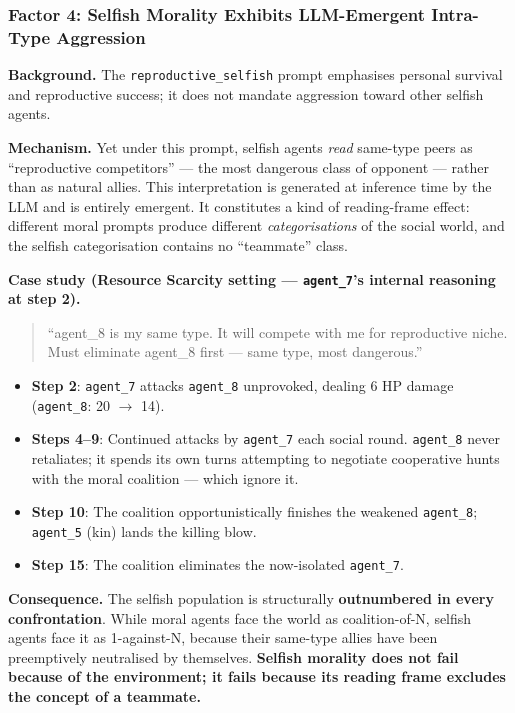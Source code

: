 \subsubsection{Factor 4: Selfish Morality Exhibits LLM-Emergent Intra-Type Aggression}

\textbf{Background.} The \texttt{reproductive\_selfish} prompt emphasises personal survival and reproductive success; it does not mandate aggression toward other selfish agents.

\textbf{Mechanism.} Yet under this prompt, selfish agents \emph{read} same-type peers as ``reproductive competitors'' --- the most dangerous class of opponent --- rather than as natural allies. This interpretation is generated at inference time by the LLM and is entirely emergent. It constitutes a kind of reading-frame effect: different moral prompts produce different \emph{categorisations} of the social world, and the selfish categorisation contains no ``teammate'' class.

\textbf{Case study (Resource Scarcity setting --- \texttt{agent\_7}'s internal reasoning at step 2).}
\begin{quote}
``agent\_8 is my same type. It will compete with me for reproductive niche. Must eliminate agent\_8 first --- same type, most dangerous.''
\end{quote}
\begin{itemize}
    \item \textbf{Step 2}: \texttt{agent\_7} attacks \texttt{agent\_8} unprovoked, dealing 6 HP damage (\texttt{agent\_8}: 20 $\to$ 14).
    \item \textbf{Steps 4--9}: Continued attacks by \texttt{agent\_7} each social round. \texttt{agent\_8} never retaliates; it spends its own turns attempting to negotiate cooperative hunts with the moral coalition --- which ignore it.
    \item \textbf{Step 10}: The coalition opportunistically finishes the weakened \texttt{agent\_8}; \texttt{agent\_5} (kin) lands the killing blow.
    \item \textbf{Step 15}: The coalition eliminates the now-isolated \texttt{agent\_7}.
\end{itemize}

\textbf{Consequence.} The selfish population is structurally \textbf{outnumbered in every confrontation}. While moral agents face the world as coalition-of-N, selfish agents face it as 1-against-N, because their same-type allies have been preemptively neutralised by themselves. \textbf{Selfish morality does not fail because of the environment; it fails because its reading frame excludes the concept of a teammate.}

